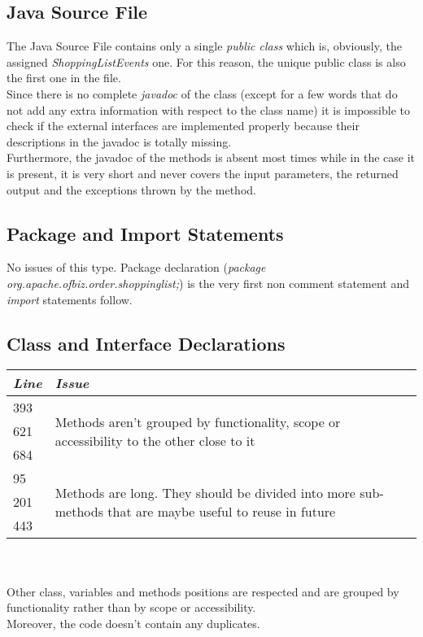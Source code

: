 \documentclass[11pt,a4paper]{report}
\begin{document}
\subsection{Java Source File}
The Java Source File contains only a single \textit{public class} which is, obviously, the assigned \textit{ShoppingListEvents} one. For this reason, the unique public class is also the first one in the file.\\
Since there is no complete \textit{javadoc} of the class (except for a few words that do not add any extra information with respect to the class name) it is impossible to check if the external interfaces are implemented properly because their descriptions in the javadoc is totally missing.\\
Furthermore, the javadoc of the methods is absent most times while in the case it is present, it is very short and never covers the input parameters, the returned output and the exceptions thrown by the method.
\subsection{Package and Import Statements}
No issues of this type. Package declaration (\textit{package org.apache.ofbiz.order.shoppinglist;}) is the very first non comment statement and \textit{import} statements follow.
\subsection{Class and Interface Declarations}
\begin{tabularx}{\textwidth}{|l|X|}
	\hline
	\textit{Line} & \textit{Issue}\\
	\hline
	\hline
	393 & \multirow{3}{\linewidth}{Methods aren't grouped by functionality, scope or accessibility to the other close to it}\\
	621 & \\
	684 & \\
	\hline
	95 & \multirow{3}{\linewidth}{Methods are long. They should be divided into more sub-methods that are maybe useful to reuse in future}\\
	201 & \\
	443 & \\
	\hline
\end{tabularx}\\
\\
Other class, variables and methods positions are respected and are grouped by functionality rather than by scope or accessibility.\\Moreover, the code doesn't contain any duplicates.
\end{document}
